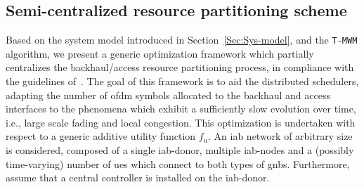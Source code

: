 \subsection{Semi-centralized resource partitioning scheme}
\label{Sec:Cent-scheme}
Based on the system model introduced in Section~\ref{Sec:Sys-model}, and the \texttt{T-MWM} algorithm, we present a generic optimization framework which partially centralizes the backhaul/access resource partitioning process, in compliance with the guidelines of~\cite{3gpp_38_874}. 
The goal of this framework is to aid the distributed schedulers, adapting the number of \gls{ofdm} symbols allocated to the backhaul and access interfaces to the phenomena which exhibit a sufficiently slow evolution over time, i.e., large scale fading and local congestion. %
This optimization is undertaken with respect to a generic additive utility function $f_u$. An \gls{iab} network of arbitrary size is considered, composed of a single \gls{iab}-donor, multiple \gls{iab}-nodes and a (possibly time-varying) number of \glspl{ue} which connect to both types of \glspl{gnb}.
Furthermore, %
assume that a central controller is installed on the \gls{iab}-donor. 

